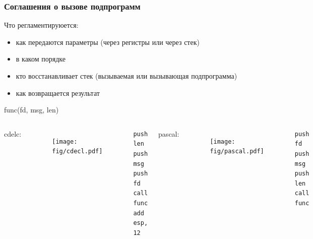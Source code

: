 \documentclass[utf8, russian]{beamer}
\begin{document}
    \begin{frame}[fragile]
        \frametitle{Соглашения о вызове подпрограмм}
    \begin{block}{Что регламентируюется:}\small
        \begin{itemize}
            \item как передаются параметры (через регистры или через стек)
            \item в каком порядке
            \item кто восстанавливает стек (вызываемая или вызывающая подпрограмма)
            \item как возвращается результат
        \end{itemize}
    \end{block}
        \centerline{func(fd, msg, len)}
        \begin{columns}
            \centerline{cdelc:}
            \begin{columns}
                    \begin{figure}
                        \texttt{[image: fig/cdecl.pdf]}
                    \end{figure}
                \begin{verbatim}
push len
push msg
push fd
call func
add esp, 12
                \end{verbatim}
            \end{columns}

            \centerline{pascal:}
            \begin{columns}
                    \begin{figure}
                        \texttt{[image: fig/pascal.pdf]}
                    \end{figure}
                \begin{verbatim}
push fd
push msg
push len
call func

                \end{verbatim}
            \end{columns}
        \end{columns}
\end{frame}
\end{document}
